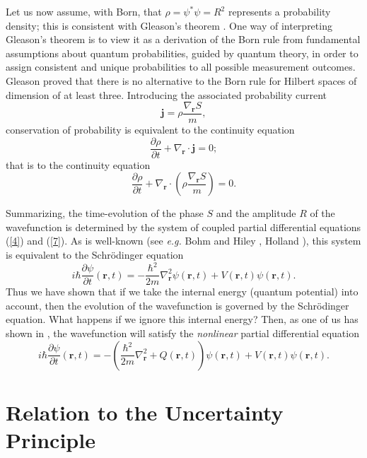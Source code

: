 \documentclass[11pt]{article}%
\begin{document}
Let us now assume, with Born, that $\rho=\psi^{\ast}\psi=R^{2}$ represents a
probability density; this is consistent with Gleason's theorem \cite{Gleason}.
One way of interpreting Gleason's theorem is to view it as a derivation of the
Born rule from fundamental assumptions about quantum probabilities, guided by
quantum theory, in order to assign consistent and unique probabilities to all
possible measurement outcomes. Gleason proved that there is no alternative to
the Born rule for Hilbert spaces of dimension of at least three. Introducing
the associated probability current
\begin{equation}
\mathbf{j}=\rho\frac{\nabla_{\mathbf{r}}S}{m}, \label{5}%
\end{equation}
conservation of probability is equivalent to the continuity equation%
\begin{equation}
\frac{\partial\rho}{\partial t}+\nabla_{\mathbf{r}}\cdot\mathbf{j}=0;
\label{6}%
\end{equation}
that is to the continuity equation%
\begin{equation}
\frac{\partial\rho}{\partial t}+\nabla_{\mathbf{r}}\cdot\left(  \rho
\frac{\nabla_{\mathbf{r}}S}{m}\right)  =0. \label{7}%
\end{equation}


Summarizing, the time-evolution of the phase $S$ and the amplitude $R$ of the
wavefunction is determined by the system of coupled partial differential
equations (\ref{4}) and (\ref{7}). As is well-known (see \textit{e.g.} Bohm
and Hiley \cite{bohipilot}, Holland \cite{Holland}), this system is equivalent
to the Schr\"{o}dinger equation%
\[
i\hbar\frac{\partial\psi}{\partial t}(\mathbf{r},t)=-\frac{\hbar^{2}}%
{2m}\nabla_{\mathbf{r}}^{2}\psi(\mathbf{r},t)+V(\mathbf{r},t)\psi
(\mathbf{r},t).
\]
Thus we have shown that if we take the internal energy (quantum potential)
into account, then the evolution of the wavefunction is governed by the
Schr\"{o}dinger equation. What happens if we ignore this internal energy?
Then, as one of us has shown in \cite{ICP}, the wavefunction will satisfy the
\emph{nonlinear} partial differential equation%
\[
i\hbar\frac{\partial\psi}{\partial t}(\mathbf{r},t)=-\left(  \frac{\hbar^{2}%
}{2m}\nabla_{\mathbf{r}}^{2}+Q(\mathbf{r},t)\right)  \psi(\mathbf{r}%
,t)+V(\mathbf{r},t)\psi(\mathbf{r},t).
\]


\section{Relation to the Uncertainty Principle}
\end{document}
